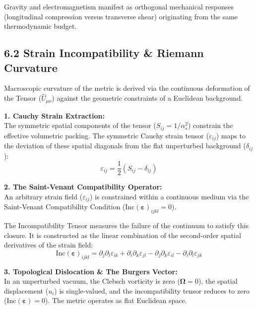 Gravity and electromagnetism manifest as orthogonal mechanical responses (longitudinal compression versus transverse shear) originating from the same thermodynamic budget.

\subsection*{6.2 Strain Incompatibility \& Riemann Curvature}
\label{sec:deriv_incompatibility}

Macroscopic curvature of the metric is derived via the continuous deformation of the Tensor ($\hat{U}_{\mu\nu}$) against the geometric constraints of a Euclidean background.

\textbf{1. Cauchy Strain Extraction:} \\
The symmetric spatial components of the tensor ($S_{ij} = 1/\alpha_s^2$) constrain the effective volumetric packing. The symmetric Cauchy strain tensor ($\varepsilon_{ij}$) maps to the deviation of these spatial diagonals from the flat unperturbed background ($\delta_{ij}$): 
\begin{equation}
    \varepsilon_{ij} = \frac{1}{2}\left( S_{ij} - \delta_{ij} \right) 
\end{equation}

\textbf{2. The Saint-Venant Compatibility Operator:} \\
An arbitrary strain field ($\varepsilon_{ij}$) is constrained within a continuous medium via the Saint-Venant Compatibility Condition ($\text{Inc}(\boldsymbol{\varepsilon})_{ijkl} = 0$). 

The Incompatibility Tensor measures the failure of the continuum to satisfy this closure. It is constructed as the linear combination of the second-order spatial derivatives of the strain field: 
\begin{equation}
    \text{Inc}(\boldsymbol{\varepsilon})_{ijkl} = \partial_j \partial_l \varepsilon_{ik} + \partial_i \partial_k \varepsilon_{jl} - \partial_j \partial_k \varepsilon_{il} - \partial_i \partial_l \varepsilon_{jk} 
\end{equation}

\textbf{3. Topological Dislocation \& The Burgers Vector:} \\
In an unperturbed vacuum, the Clebsch vorticity is zero ($\boldsymbol{\Omega} = 0$), the spatial displacement ($u_i$) is single-valued, and the incompatibility tensor reduces to zero ($\text{Inc}(\boldsymbol{\varepsilon}) = 0$). The metric operates as flat Euclidean space.

